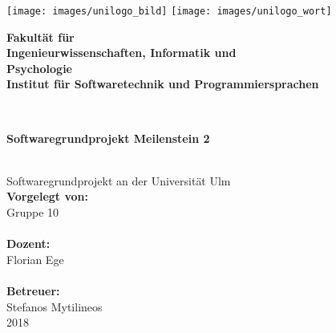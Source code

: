 \documentclass[a4paper,12pt,
headsepline,           %
oneside,               %
pointlessnumbers,      %
bibtotoc,              %
]{scrartcl}
\newcommand{\fullname}{Gruppe 10}
\newcommand{\titel}{Softwaregrundprojekt Meilenstein 2}
\newcommand{\jahr}{2018}
\newcommand{\dozent}{Florian Ege}
\newcommand{\betreuer}{Stefanos Mytilineos}
\newcommand{\fakultaet}{Ingenieurwissenschaften, Informatik und\\Psychologie}
\newcommand{\institut}{Institut für Softwaretechnik und Programmiersprachen}
\begin{document}
    \thispagestyle{empty}
    \begin{addmargin*}[4mm]{-10mm}

        \texttt{[image: images/unilogo\_bild]}
        \hfill
        \texttt{[image: images/unilogo\_wort]}\\[1em]

        {\footnotesize
        \hspace*{115mm}\parbox[t]{35mm}{\bfseries Fakultät für\\
        \fakultaet\\
        \mdseries \institut}\\[2cm]

        \parbox{140mm}{\bfseries \LARGE \titel}\\[2.5em]
        {\footnotesize Softwaregrundprojekt an der Universität Ulm}\\[3em]

        {\footnotesize \bfseries Vorgelegt von:}\\
        {\footnotesize \fullname\\}\\ [1em]
        {\footnotesize \bfseries Dozent:}\\
        {\footnotesize \dozent\\}\\[1em]
        {\footnotesize \bfseries Betreuer:}\\
        {\footnotesize \betreuer}\\ [1em]
        {\footnotesize \jahr}
        }
    \end{addmargin*}
    \pagebreak
    \tableofcontents
    \pagebreak
\end{document}
